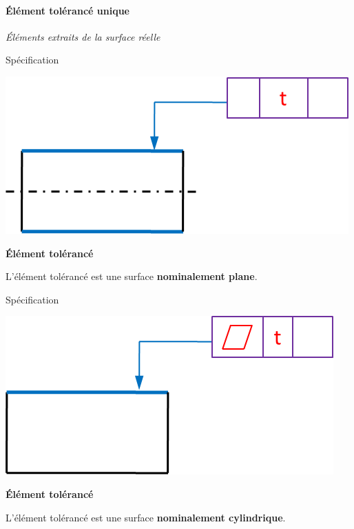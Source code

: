 \documentclass[11pt,oneside]{article}
\begin{document}
\paragraph*{Élément tolérancé unique}
\begin{exemple}

\textit{Éléments extraits de la surface réelle}

\begin{minipage}[t]{.45\linewidth}
\begin{center}
Spécification

\includegraphics[width=.95\textwidth]{png/et_cyl}
\end{center}
\end{minipage} \hfill
\begin{minipage}[t]{.45\linewidth}
\begin{center}
\textbf{Élément tolérancé}
\end{center}

L'élément tolérancé est une surface \textbf{nominalement plane}.
\end{minipage} 

\begin{minipage}[t]{.45\linewidth}
\begin{center}
Spécification

\includegraphics[width=.95\textwidth]{png/et_plan}
\end{center}
\end{minipage} \hfill
\begin{minipage}[t]{.45\linewidth}
\begin{center}
\textbf{Élément tolérancé}
\end{center}

L'élément tolérancé est une surface \textbf{nominalement cylindrique}.
\end{minipage} 
\end{exemple}
\end{document}
